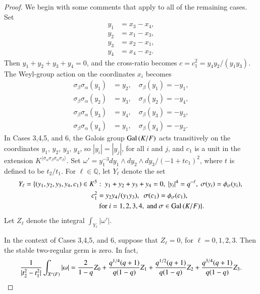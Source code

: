 \documentclass{amsart}
\newcommand\Q{{\mathbb Q}}
\newcommand\Gal{\hbox{Gal\,}}
\newenvironment{cthm}[1]
  {\renewcommand\thethm{\bf #1}\thm}
  {\endthm}
\begin{document}
\begin{proof}
We begin with some comments that apply to all of the
remaining cases.
Set
\begin{align*}
y_1 &= x_3 - x_4,\\
y_2 &= x_1 - x_3, \\
y_3 &= x_2 - x_1,\\
y_4 &= x_4 - x_2.
\end{align*}
Then $y_1+y_2+y_3+y_4=0$, and the cross-ratio becomes
$c=c_1^2 = y_4 y_2/(y_1 y_3)$.  The Weyl-group action on the
coordinates $x_i$ becomes
\begin{equation}
\begin{aligned}
\sigma_\beta\sigma_\alpha(y_1) &= y_2,\quad \sigma_\beta(y_1) = -y_1,\\
\sigma_\beta\sigma_\alpha(y_2) &= y_3,\quad \sigma_\beta(y_2) = -y_4,\\
\sigma_\beta\sigma_\alpha(y_3) &= y_4,\quad \sigma_\beta(y_3) = -y_3,\\
\sigma_\beta\sigma_\alpha(y_4) &= y_1,\quad \sigma_\beta(y_4) = -y_2.
\end{aligned}\tag{3.5}
\end{equation}
In Cases 3,4,5, and 6, the Galois group $\Gal(K/F)$ acts transitively
on the coordinates $y_1$, $y_2$, $y_3$, $y_4$, so
$|y_i|=|y_j|$, for all $i$ and $j$, and $c_1$ is a unit in the
extension 
$K^{\langle\sigma_\alpha\sigma_\beta\sigma_\alpha\sigma_\beta\rangle}$.
Set 
$\omega' = y_1^{-3}dy_1\wedge dy_2\wedge dy_3/(-1 + t c_1)^2$,
where $t$ is defined to be $t_2/t_1$.  
For $\ell\in\Q$, let $Y_\ell$ 
denote the set
\begin{align*}
Y_\ell= \{(y_1,y_2,y_3,y_4,c_1)\in K^5&: \ y_1+y_2+y_3+y_4=0,\ 
 |y_i|^4 = q^{-\ell},\ \sigma(y_i)=\phi_\sigma(y_i),\ \\
 c_1^2 &= y_2 y_4/(y_1 y_3),\ \ 
 \sigma(c_1) = \phi_\sigma(c_1),\\
   &\text{ for }
 i=1,2,3,4,\text{ and } \sigma\in\Gal(K/F)\}.
\end{align*}
Let $Z_\ell$ denote the integral $\int_{Y_\ell} |\omega'|$.

\bigskip
\noindent
\begin{cthm}{Lemma 3.6}   In the context of Cases 3,4,5, and 6, suppose that
$Z_\ell=0$,
for $\ell=0,1,2,3$.  Then the stable
two-regular germ is zero.
In fact,
$$
{1\over |t_2^2-t_1^2|} \int_{X^*(F)}|\omega| =
{2\over 1-q} Z_0 + {q^{1/4} (q+1)\over q (1-q)} Z_1 +
{q^{1/2} (q+1)\over q (1-q)} Z_2 + {q^{3/4} (q+1)\over q (1-q)}
Z_3.$$
\end{cthm}
\bigskip


\end{proof}
\end{document}

